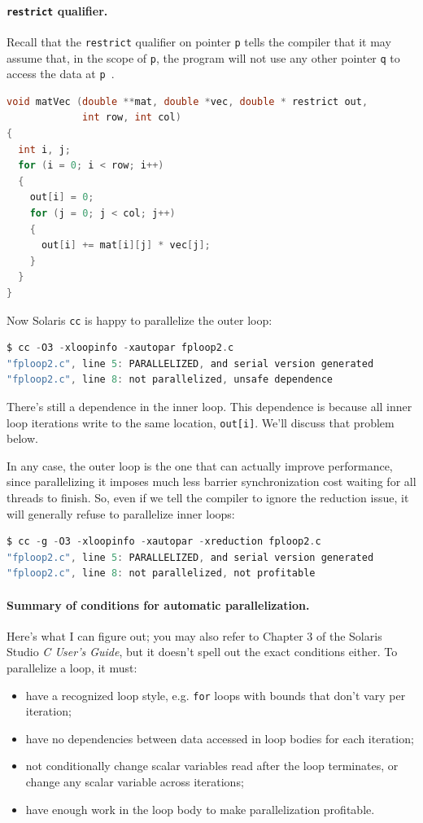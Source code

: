 \documentclass[a4paper]{report}
\begin{document}
\paragraph{{\tt restrict} qualifier.} 
Recall that the {\tt restrict} qualifier on pointer {\tt p} tells
the compiler that it may assume that, in the scope of {\tt p},
the program will not use any other pointer {\tt q} to access the
data at {\tt *p}~\cite{cellperf}.
{
\begin{lstlisting}[language=C]
void matVec (double **mat, double *vec, double * restrict out,
             int row, int col) 
{
  int i, j;
  for (i = 0; i < row; i++)
  {
    out[i] = 0;
    for (j = 0; j < col; j++)
    {
      out[i] += mat[i][j] * vec[j];
    }
  }
}
\end{lstlisting}
}

Now Solaris {\tt cc} is happy to parallelize the outer loop:
{\small 
\begin{lstlisting}[language=C]
$ cc -O3 -xloopinfo -xautopar fploop2.c 
"fploop2.c", line 5: PARALLELIZED, and serial version generated
"fploop2.c", line 8: not parallelized, unsafe dependence
\end{lstlisting} 
}

There's still a dependence in the inner loop. This dependence is because
all inner loop iterations write to the same location, {\tt out[i]}. We'll
discuss that problem below.

In any case, the outer loop is the one that can actually improve performance,
since parallelizing it imposes much less barrier synchronization cost 
waiting for all threads to finish. So, even if we tell the compiler to ignore
the reduction issue, it will generally refuse to parallelize inner loops:
{\small 
\begin{lstlisting}[language=C]
$ cc -g -O3 -xloopinfo -xautopar -xreduction fploop2.c 
"fploop2.c", line 5: PARALLELIZED, and serial version generated
"fploop2.c", line 8: not parallelized, not profitable
\end{lstlisting} 
}


\paragraph{Summary of conditions for automatic parallelization.} Here's what I 
can figure out; you may also refer to Chapter 3 of the Solaris Studio
\emph{C User's Guide}, but it doesn't spell out the exact conditions
either. To parallelize a loop, it must:
\begin{itemize}
\item have a recognized loop style, e.g. {\tt for} loops with
bounds that don't vary per iteration;
\item have no dependencies between data accessed in loop bodies for
  each iteration;
\item not conditionally change scalar variables read after the loop
  terminates, or change any scalar variable across iterations;
\item have enough work in the loop body to make parallelization profitable.
\end{itemize}
\end{document}
